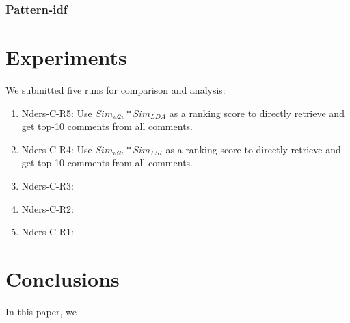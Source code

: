 \documentclass{llncs}
\begin{document}
\subsubsection{Pattern-idf}

\section{Experiments}
We submitted five runs for comparison and analysis:

\begin{enumerate}
  \item{Nders-C-R5: } Use $Sim_{w2v}*Sim_{LDA}$ as a ranking score to directly 
  retrieve and get top-10 comments from all comments.
  \item{Nders-C-R4: } Use $Sim_{w2v}*Sim_{LSI}$ as a ranking score to directly 
  retrieve and get top-10 comments from all comments.
  \item{Nders-C-R3: }
  \item{Nders-C-R2: }
  \item{Nders-C-R1: }
\end{enumerate}

\section{Conclusions}

In this paper, we  

%
%
\begin{thebibliography}{5}




\end{thebibliography}
\end{document}
